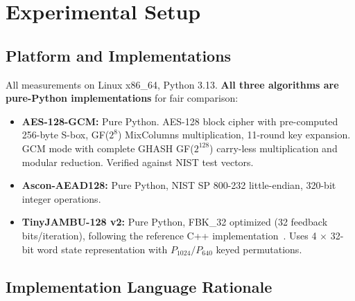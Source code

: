 \documentclass[11pt,a4paper]{article}
\begin{document}
\section{Experimental Setup}

\subsection{Platform and Implementations}

All measurements on Linux x86\_64, Python 3.13. \textbf{All three algorithms are pure-Python implementations} for fair comparison:

\begin{itemize}
    \item \textbf{AES-128-GCM:} Pure Python. AES-128 block cipher with pre-computed 256-byte S-box, GF($2^8$) MixColumns multiplication, 11-round key expansion. GCM mode with complete GHASH GF($2^{128}$) carry-less multiplication and modular reduction. Verified against NIST test vectors.
    \item \textbf{Ascon-AEAD128:} Pure Python, NIST SP 800-232 little-endian, 320-bit integer operations.
    \item \textbf{TinyJAMBU-128 v2:} Pure Python, FBK\_32 optimized (32 feedback bits/iteration), following the reference C++ implementation~\cite{itzmeanjan_tj}. Uses 4 $\times$ 32-bit word state representation with $P_{1024}/P_{640}$ keyed permutations.
\end{itemize}

\subsection{Implementation Language Rationale}
\end{document}
